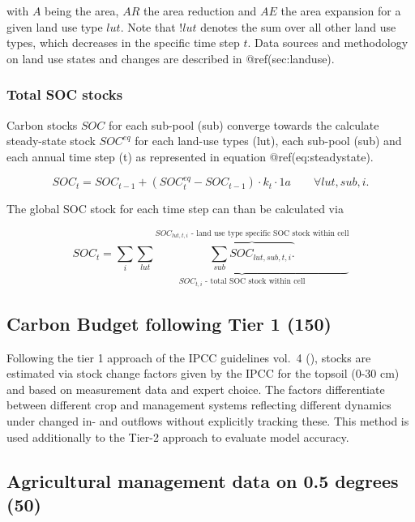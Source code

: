 \documentclass[gc, manuscript]{copernicus}
\begin{document}
with \(A\) being the area, \(AR\) the area reduction and \(AE\) the area
expansion for a given land use type \(lut\). Note that \(!lut\) denotes
the sum over all other land use types, which decreases in the specific
time step \(t\). Data sources and methodology on land use states and
changes are described in @ref(sec:landuse).

\subsubsection{Total SOC stocks}

Carbon stocks \(SOC\) for each sub-pool (sub) converge towards the
calculate steady-state stock \(SOC^{eq}\) for each land-use types (lut),
each sub-pool (sub) and each annual time step (t) as represented in
equation @ref(eq:steadystate).

\begin{equation}
SOC_{t} = SOC_{t-1} + (SOC^{eq}_{t} - SOC_{t-1}) \cdot k_{t} \cdot 1\unit{a} \qquad \forall lut, sub, i.
\label{eq:steadystate}
\end{equation}

The global SOC stock for each time step can than be calculated via

\begin{equation}
SOC_{t} = \sum_{i} \underbrace{\sum_{lut} \overbrace{\sum_{sub} SOC_{lut, sub, t, i}.}^{\text{$SOC_{lut, t, i}$ - land use type specific SOC stock within cell}}}_{\text{$SOC_{t, i}$ - total SOC stock within cell}}
\label{eq:totalstock}
\end{equation}

\newpage

\hypertarget{sec:tier1}{%
\subsection{Carbon Budget following Tier 1 (150)}\label{sec:tier1}}

Following the tier 1 approach of the IPCC guidelines vol.~4
(\citet{ipcc_2006_2006}), stocks are estimated via stock change factors
given by the IPCC for the topsoil (0-30 cm) and based on measurement
data and expert choice. The factors differentiate between different crop
and management systems reflecting different dynamics under changed in-
and outflows without explicitly tracking these. This method is used
additionally to the Tier-2 approach to evaluate model accuracy.

\hypertarget{sec:agrimanagement}{%
\subsection{Agricultural management data on 0.5 degrees
(50)}\label{sec:agrimanagement}}
\end{document}
